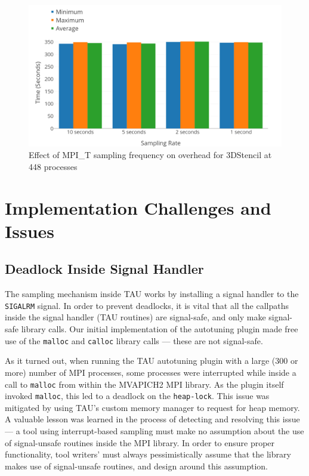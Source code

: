 \begin{center}
        \begin{figure}[tbp!]
                 \includegraphics[width=\columnwidth,keepaspectratio,scale=1.0]{figures/MPI_T_Sampling_Frequently}
                \captionsetup{justification=centering}
                  \caption{Effect of MPI\_T sampling frequency on overhead for 3DStencil at 448 processes}
                   \label{fig:sampling_frequency}
        \end{figure}
\end{center}

\section{Implementation Challenges and Issues}
\subsection{Deadlock Inside Signal Handler} 
The sampling mechanism inside TAU works by installing a signal handler to the \verb+SIGALRM+ signal. In order to prevent deadlocks, it is vital that all the callpaths inside the signal handler (TAU routines) are signal-safe, and only make signal-safe library calls. Our initial implementation of the autotuning plugin made free use of the \verb+malloc+ and \verb+calloc+ library calls --- these are not signal-safe. 
\par As it turned out, when running the TAU autotuning plugin with a large (300 or more) number of MPI processes, some processes were interrupted while inside a call to \verb+malloc+ from within the MVAPICH2 MPI library. As the plugin itself invoked \verb+malloc+, this led to a deadlock on the \verb+heap-lock+. This issue was mitigated by using TAU's custom memory manager to request for heap memory. A valuable lesson was learned in the process of detecting and resolving this issue --- a tool using interrupt-based sampling must make no assumption about the use of signal-unsafe routines inside the MPI library. In order to ensure proper functionality, tool writers' must always pessimistically assume that the library makes use of signal-unsafe routines, and design around this assumption.

